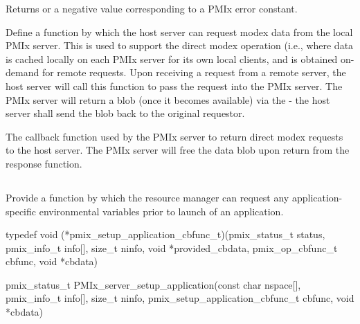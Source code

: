 Returns  or a negative value corresponding to a PMIx error constant.

\descr

Define a function by which the host server can request modex data from the local PMIx server.
This is used to support the direct modex operation (i.e., where data is cached locally on each PMIx server for its own local clients, and is obtained on-demand for remote requests.
Upon receiving a request from a remote server, the host server will call this function to pass the request into the PMIx server.
The PMIx server will return a blob (once it becomes available) via the  - the host server shall send the blob back to the original requestor.

The callback function used by the PMIx server to return direct modex requests to the host server.
The PMIx server will free the data blob upon return from the response function.


\subsection{}

\summary

Provide a function by which the resource manager can request any application-specific environmental variables prior to launch of an application.
 
\format

\cspecificstart
\begin{codepar}
typedef void (*pmix_setup_application_cbfunc_t)(pmix_status_t status,
                                                pmix_info_t info[], size_t ninfo,
                                                void *provided_cbdata,
                                                pmix_op_cbfunc_t cbfunc, void *cbdata)

pmix_status_t PMIx_server_setup_application(const char nspace[],
                                            pmix_info_t info[], size_t ninfo,
                                            pmix_setup_application_cbfunc_t cbfunc,
                                            void *cbdata)
\end{codepar}
\cspecificend

\begin{arglist}
\end{arglist}

